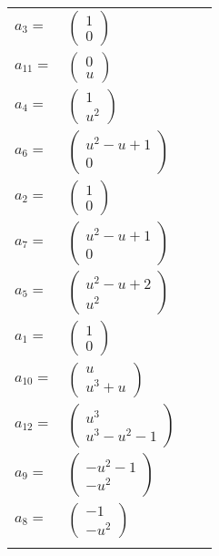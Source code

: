 \documentclass[1p]{elsarticle_modified}
\theoremstyle{definition}
\begin{document}
\begin{tabular}{m{7pt} m{180pt} m{7pt} m{180pt} }
\flushright $a_{3}=$&$\begin{pmatrix}1\\0\end{pmatrix}$ \\
\flushright $a_{11}=$&$\begin{pmatrix}0\\u\end{pmatrix}$ \\
\flushright $a_{4}=$&$\begin{pmatrix}1\\u^2\end{pmatrix}$ \\
\flushright $a_{6}=$&$\begin{pmatrix}u^2- u+1\\0\end{pmatrix}$ \\
\flushright $a_{2}=$&$\begin{pmatrix}1\\0\end{pmatrix}$ \\
\flushright $a_{7}=$&$\begin{pmatrix}u^2- u+1\\0\end{pmatrix}$ \\
\flushright $a_{5}=$&$\begin{pmatrix}u^2- u+2\\u^2\end{pmatrix}$ \\
\flushright $a_{1}=$&$\begin{pmatrix}1\\0\end{pmatrix}$ \\
\flushright $a_{10}=$&$\begin{pmatrix}u\\u^3+u\end{pmatrix}$ \\
\flushright $a_{12}=$&$\begin{pmatrix}u^3\\u^3- u^2-1\end{pmatrix}$ \\
\flushright $a_{9}=$&$\begin{pmatrix}- u^2-1\\- u^2\end{pmatrix}$ \\
\flushright $a_{8}=$&$\begin{pmatrix}-1\\- u^2\end{pmatrix}$\\&\end{tabular}
\end{document}
